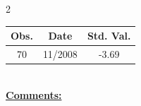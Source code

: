 
\bigskip 
\begin{multicols}{2}{ 
\begin{tabular}{ccc}
\hline  Obs.  &  Date &  Std. Val. \\ 
\hline 
                       70 &       11/2008 &         -3.69 \vspace{-.12in} \\  
 \end{tabular} 
\\ 
 \columnbreak 
 \singlespacing 
 \underline{\textbf{Comments:}} \\ 
 \bigskip       

 } 
\end{multicols} 
